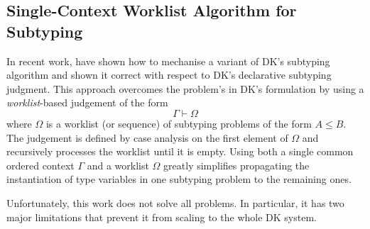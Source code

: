 % 
% 
% 
\subsection{Single-Context Worklist Algorithm for Subtyping}

In recent work, \citet{itp2018} have shown how to mechanise a variant of DK's
subtyping algorithm and shown it correct with respect to DK's declarative
subtyping judgment. This approach overcomes the problem's in DK's formulation
by using a \emph{worklist}-based judgement of the form $$\Gamma \vdash \Omega$$
where $\Omega$ is a worklist (or sequence) of subtyping problems of the
form $A \leq B$.  The judgement is defined by case analysis on the first
element of $\Omega$ and recursively processes the worklist until it is empty.
Using both a single common ordered context $\Gamma$ and a worklist $\Omega$ greatly
simplifies propagating the instantiation of type variables in one
subtyping problem to the remaining ones.

Unfortunately, this work does not solve all problems. In particular, it has two
major limitations that prevent it from scaling to the whole DK system. 

